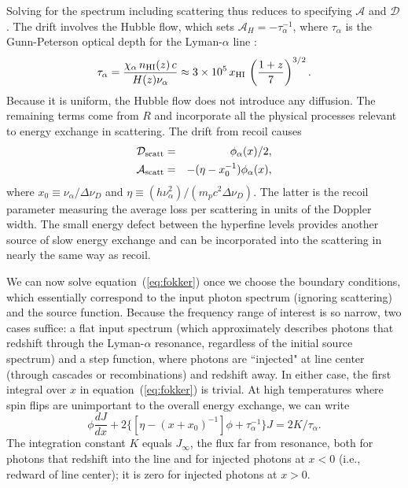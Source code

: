Solving for the spectrum including scattering thus reduces to specifying ${\mathcal A}$ and ${\mathcal D}$.  The drift involves the Hubble flow, which sets ${\mathcal A}_H= - \tau_\alpha^{-1}$, where $\tau_\alpha$ is the Gunn-Peterson optical depth for the Lyman-$\alpha$ line \cite{gunn65, scheuer65}:
\begin{equation}
\tau_{\alpha} = \frac{\chi_\alpha \, n_{\rm HI}(z) \, c}{H(z) \nu_\alpha} \approx 3 \times 10^5 \, x_{\rm HI} \, \left( \frac{1+z}{7} \right)^{3/2}.
\label{eq:taugp}
\end{equation}
Because it is uniform, the Hubble flow does not introduce any diffusion. The remaining terms come from $R$ and
incorporate all the physical processes relevant to energy exchange in scattering.  The drift from recoil causes \cite{hirata06}
\begin{eqnarray}
{\mathcal D}_{\rm scatt} & = & \phi_\alpha(x)/2,
\label{eq:Dkin} \\
{\mathcal A}_{\rm scatt} & = &  -(\eta - x_0^{-1} ) \phi_\alpha(x),
\label{eq:Akin}
\end{eqnarray}
where $x_0 \equiv \nu_\alpha/\Delta \nu_D$ and $\eta \equiv (h \nu_\alpha^2)/(m_p c^2 \Delta \nu_D)$.  The latter is the recoil parameter measuring the average loss per scattering in units of the Doppler width.  The small energy defect between the hyperfine levels provides another source of slow energy exchange \cite{hirata06} and can be incorporated into the scattering in nearly the same way as recoil.

We can now solve equation~(\ref{eq:fokker}) once we choose the boundary conditions, which essentially correspond to the input photon spectrum (ignoring scattering) and the source function.  Because the
frequency range of interest is so narrow, two cases suffice: a flat input spectrum (which approximately describes photons that redshift through the Lyman-$\alpha$ resonance, regardless of the initial source spectrum)
and a step function, where photons are ``injected" at line center (through cascades or recombinations) and redshift away.  In either case, the first integral over $x$ in equation~(\ref{eq:fokker}) is trivial. At high temperatures where spin flips are unimportant to the overall energy exchange, we can write
\begin{equation}
\phi \frac{d J}{d x} + 2 \{ [\eta - (x + x_0)^{-1}] \phi + \tau_\alpha^{-1} \} J = 2 K / \tau_\alpha.
\label{eq:fokk-simp}
\end{equation}
The integration constant $K$ equals $J_\infty$, the flux far from resonance, both for photons that redshift into the line and for injected photons at $x<0$ (i.e., redward of line center); it is zero for injected photons at $x>0$.  

